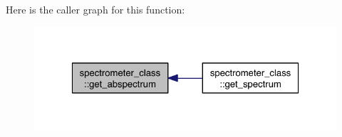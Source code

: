 Here is the caller graph for this function\-:
\nopagebreak
\begin{figure}[H]
\begin{center}
\leavevmode
\includegraphics[width=324pt]{classspectrometer__class_ad2c4936524c8702e1c4e53a54a043f31_icgraph}
\end{center}
\end{figure}


\hypertarget{classspectrometer__class_a068171434fa75613677e6357291df1fe}{
}
